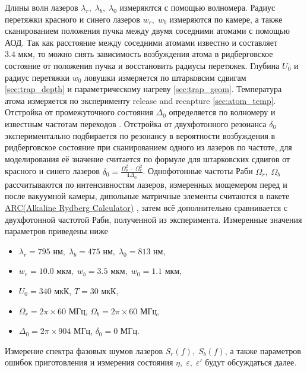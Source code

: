Длины волн лазеров $\lambda_r, \; \lambda_b, \; \lambda_0$ измеряются с помощью волномера. Радиус перетяжки красного и синего лазеров $w_r, \; w_b$ измеряются по камере, а также сканированием положения пучка между двумя соседними атомами с помощью АОД. Так как расстояние между соседними атомами известно и составляет $3.4 \text{ мкм}$, то можно снять зависимость возбуждения атома в ридберговское состояние от положения пучка и восстановить радиусы перетяжек. Глубина $U_0$ и радиус перетяжки $w_0$ ловушки измеряется по штарковсим сдвигам \ref{sec:trap_depth} и параметрическому нагреву \ref{sec:trap_geom}. Температура атома измеряется по эксперименту release and recapture \ref{sec:atom_temp}. Отстройка от промежуточного состояния $\Delta_0$ определяется по волномеру и известным частотам переходов \cite{Rb87}. Отстройка от двухфотонного резонанса $\delta_0$ экспериментально подбирается по резонансу в вероятности возбуждения в ридберговское состояние при сканированием одного из лазеров по частоте, для моделирования её значение считается по формуле для штарковских сдвигов от красного и синего лазеров $\delta_0 = \frac{\Omega_b^2 - \Omega_r^2}{4\Delta_0}$. Однофотонные частоты Раби $\Omega_r, \; \Omega_b$ рассчитываются по интенсивностям лазеров, измеренных мощемером перед и после вакуумной камеры, дипольные матричные элементы считаются в пакете \href{https://arc-alkali-rydberg-calculator.readthedocs.io/en/latest/}{ARC(Alkaline Rydberg Calculator)} \cite{ROBERTSON2021107814}, затем всё дополнительно сравнивается с двухфотонной частотой Раби, полученной из эксперимента. Измеренные значения параметров приведены ниже

\begin{itemize}
	\item $\lambda_r = 795\text{ нм}, \; \lambda_b = 475 \text{ нм}, \; \lambda_0 = 813 \text{ нм}$, 
	\item $w_r = 10.0\text{ мкм}, \; w_b = 3.5 \text{ мкм}, \; w_0 = 1.1 \text{ мкм}$,
	\item $U_0 = 340\text{ мкК}$, $T = 30\text{ мкК}$,
	\item $\Omega_r = 2\pi \times 60 \text{ МГц}$, $\Omega_b = 2\pi \times 60\text{ МГц}$,
	\item $\Delta_0 = 2\pi \times 904 \text{ МГц}$, $\delta_0 = 0 \text{ МГц}$.
\end{itemize}

Измерение спектра фазовых шумов лазеров $S_r(f), \; S_b(f)$, а также параметров ошибок приготовления и измерения состояния $\eta, \; \varepsilon, \; \varepsilon'$ будут обсуждаться далее.


